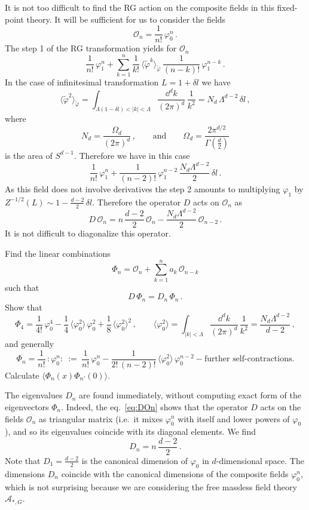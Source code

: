It is not too difficult to find the RG action on the composite fields in this
fixed-point theory. It will be sufficient for us to consider the fields
\[
\mathcal O_n=\frac1{n!}\,\varphi_0^n\,.
\]
The step 1 of the RG transformation yields for $\mathcal O_n$
\[
\frac1{n!}\,\varphi_1^n+\sum_{k=1}^n\frac1{k!}\,\langle\tilde\varphi^k\rangle_{\tilde\varphi}\,\frac1{(n-k)!}\,\varphi_1^{n-k}\,.
\]
In the case of infinitesimal transformation $L=1+\delta l$ we have
\[
\langle\tilde\varphi^2\rangle_{\tilde\varphi}=\int_{\Lambda(1-\delta l)<|k|<\Lambda}\frac{\dd^dk}{(2\pi)^d}\,\frac1{k^2}=N_d\,\Lambda^{d-2}\,\delta l\,,
\]
where
\[
N_d=\frac{\Omega_d}{(2\pi)^d}\,,\qquad\text{and}\qquad\Omega_d=\frac{2\pi^{d/2}}{\Gamma\left(\frac d2\right)}
\]
is the area of $S^{d-1}$. Therefore we have in this case
\[
\frac1{n!}\,\varphi_1^n+\frac1{(n-2)!}\,\varphi_1^{n-2}\,\frac{N_d\Lambda^{d-2}}2\,\delta l\,.
\]
As this field does not involve derivatives the step 2 amounts to multiplying
$\varphi_1$ by $Z^{-1/2}(L)\sim1-\frac{d-2}2\,\delta l$. Therefore the operator
$D$ acts on $\mathcal O_n$ as
\begin{equation}\label{eq:DOn}
D\,\mathcal O_n=n\,\frac{d-2}2\,\mathcal O_n-\frac{N_d\Lambda^{d-2}}2\,\mathcal O_{n-2}\,.
\end{equation}
It is not difficult to diagonalize this operator.

\begin{exercise}
Find the linear combinations
\[
\Phi_n=\mathcal O_n+\sum_{k=1}^na_k\,\mathcal O_{n-k}
\]
such that
\[
D\,\Phi_n=D_n\,\Phi_n\,.
\]
Show that
\begin{equation}\label{eq:Phi4}
\Phi_4=\frac1{4!}\,\varphi_0^4-\frac14\,\langle\varphi_0^2\rangle\,\varphi_0^2+\frac18\,\langle\varphi_0^2\rangle^2\,,
\qquad\langle\varphi_0^2\rangle=\int_{|k|<\Lambda}\frac{\dd^dk}{(2\pi)^d}\,\frac1{k^2}=\frac{N_d\Lambda^{d-2}}{d-2}\,,
\end{equation}
and generally
\[
\Phi_n=\frac1{n!}\,{:}\varphi_0^n{:}\ :=\ \frac1{n!}\,\varphi_0^n-\frac1{2!\,(n-2)!}\,\langle\varphi_0^2\rangle\,\varphi_0^{n-2}-\text{further self-contractions.}
\]
Calculate $\langle\Phi_n(x)\Phi_{n'}(0)\rangle$.
\end{exercise}

The eigenvalues $D_n$ are found immediately, without computing exact form of the
eigenvectors $\Phi_n$. Indeed, the eq.~\eqref{eq:DOn} shows that the operator $D$
acts on the fields $\mathcal O_n$ as triangular matrix (i.e.\ it mixes
$\varphi_0^n$ with itself and lower powers of $\varphi_0$), and so its eigenvalues
coincide with its diagonal elements. We find
\[
D_n=n\,\frac{d-2}2\,.
\]
Note that $D_1=\frac{d-2}2$ is the canonical dimension of $\varphi_0$ in
$d$-dimensional space. The dimensions $D_n$ coincide with the canonical dimensions
of the composite fields $\varphi_0^n$, which is not surprising because we are
considering the free massless field theory $\mathcal A_{*,G}$.

